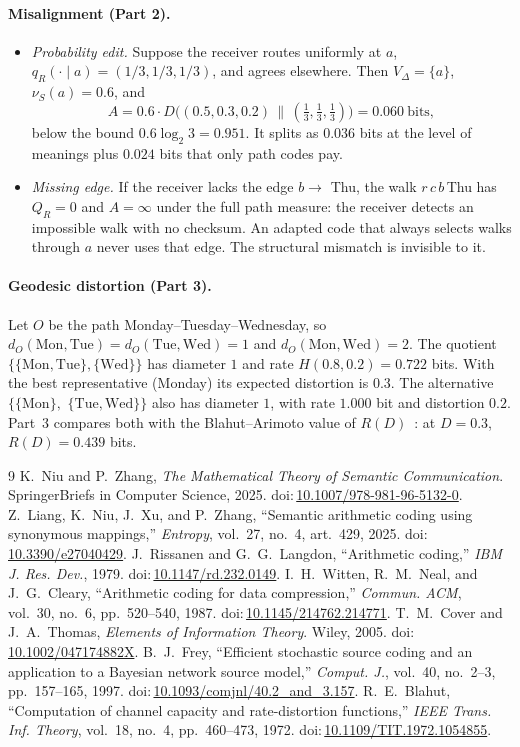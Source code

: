 \documentclass[11pt]{article}
\newcommand{\doi}[1]{doi:\,\url{#1}}
\theoremstyle{remark}
\newcommand{\D}{D}
\begin{document}
\paragraph{Misalignment (Part 2).}
\begin{itemize}
\item \emph{Probability edit.} Suppose the receiver routes uniformly at $a$, $q_R(\cdot\mid a)=(1/3,1/3,1/3)$, and agrees elsewhere. Then $V_\Delta=\{a\}$, $\nu_S(a)=0.6$, and
\[
A=0.6\cdot\D\bigl((0.5,0.3,0.2)\,\|\,(\tfrac13,\tfrac13,\tfrac13)\bigr)=0.060\ \text{bits},
\]
below the bound $0.6\log_2 3=0.951$. It splits as $0.036$ bits at the level of meanings plus $0.024$ bits that only path codes pay.
\item \emph{Missing edge.} If the receiver lacks the edge $b\to$ Thu, the walk $r\,c\,b\,$Thu has $Q_R=0$ and $A=\infty$ under the full path measure: the receiver detects an impossible walk with no checksum. An adapted code that always selects walks through $a$ never uses that edge. The structural mismatch is invisible to it.
\end{itemize}

\paragraph{Geodesic distortion (Part 3).} Let $O$ be the path Monday--Tuesday--Wednesday, so $d_O(\text{Mon},\text{Tue})=d_O(\text{Tue},\text{Wed})=1$ and $d_O(\text{Mon},\text{Wed})=2$. The quotient $\{\{\text{Mon},\text{Tue}\},\{\text{Wed}\}\}$ has diameter $1$ and rate $H(0.8,0.2)=0.722$ bits. With the best representative (Monday) its expected distortion is $0.3$. The alternative
$\{\{\text{Mon}\},$ $\{\text{Tue},\text{Wed}\}\}$ also has diameter $1$, with rate $1.000$ bit and distortion $0.2$. Part~3 compares both with the Blahut--Arimoto value of $R(D)$~\cite{blahut1972}: at $D=0.3$, $R(D)=0.439$ bits.

\begin{thebibliography}{9}
 K.~Niu and P.~Zhang, \emph{The Mathematical Theory of Semantic Communication}. SpringerBriefs in Computer Science, 2025. \doi{10.1007/978-981-96-5132-0}.
 Z.~Liang, K.~Niu, J.~Xu, and P.~Zhang, ``Semantic arithmetic coding using synonymous mappings,'' \emph{Entropy}, vol.~27, no.~4, art.~429, 2025. \doi{10.3390/e27040429}.
 J.~Rissanen and G.~G.~Langdon, ``Arithmetic coding,'' \emph{IBM J. Res. Dev.}, 1979. \doi{10.1147/rd.232.0149}.
 I.~H.~Witten, R.~M.~Neal, and J.~G.~Cleary, ``Arithmetic coding for data compression,'' \emph{Commun. ACM}, vol.~30, no.~6, pp.~520--540, 1987. \doi{10.1145/214762.214771}.
 T.~M.~Cover and J.~A.~Thomas, \emph{Elements of Information Theory}. Wiley, 2005. \doi{10.1002/047174882X}.
 B.~J.~Frey, ``Efficient stochastic source coding and an application to a Bayesian network source model,'' \emph{Comput. J.}, vol.~40, no.~2--3, pp.~157--165, 1997. \doi{10.1093/comjnl/40.2_and_3.157}.
 R.~E.~Blahut, ``Computation of channel capacity and rate-distortion functions,'' \emph{IEEE Trans. Inf. Theory}, vol.~18, no.~4, pp.~460--473, 1972. \doi{10.1109/TIT.1972.1054855}.
\end{thebibliography}
\end{document}
